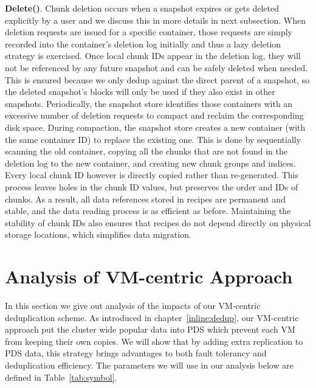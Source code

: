 \noindent\textbf{Delete()}.
Chunk deletion occurs when a snapshot expires or gets deleted explicitly by a user and we discuss this in more details in next
subsection.
When deletion requests are issued for a specific container,
those requests are simply recorded into the  container's deletion log initially and thus  a lazy
deletion strategy is exercised.
Once local chunk IDs appear in
the deletion log, they will not be referenced by any future snapshot and can be safely deleted when needed. 
This is ensured because we only dedup against the direct parent of a snapshot, so the deleted snapshot's blocks
will only be used if they also exist in other snapshots.
Periodically, the snapshot  store identifies those containers with an excessive
number of deletion requests to  compact and  reclaim the corresponding disk space. 
During compaction, the snapshot store creates a new container (with the same container ID) to replace the 
existing one. This is done by sequentially scanning the old container, copying all the chunks that are not 
found in the deletion log to the new container, and creating new chunk groups and indices. 
Every local chunk ID however is directly copied rather than re-generated. This
process leaves holes in the chunk ID values, but preserves the order and IDs of chunks.
As a result, all data references stored 
in recipes are permanent and stable, and the data reading process
is as efficient as before. Maintaining the stability of chunk IDs also ensures that recipes do not
depend directly on physical storage locations, which simplifies data migration.

\section{Analysis of VM-centric Approach}
\label{data:analysis}
In this section we give out analysis of the impacts of our VM-centric deduplication scheme. 
As introduced in chapter~\ref{inline:dedup}, our VM-centric approach put the cluster wide 
popular data into PDS which prevent each VM from keeping their own copies. We will show that by adding
extra replication to PDS data, this strategy brings advantages to both fault tolerancy and deduplication efficiency.
The parameters we will use in our analysis below are defined in Table~\ref{tab:symbol}. 

